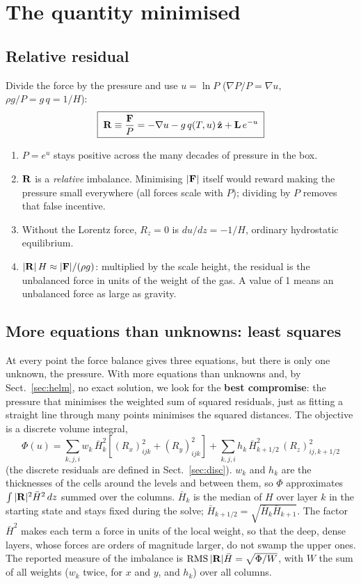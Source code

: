 \section{The quantity minimised}\label{sec:ls}
\subsection{Relative residual}
Divide the force by the pressure and use $u=\ln P$ ($\nabla P/P=\nabla u$, $\rho g/P=g\,q=1/H$):
\begin{equation}
\boxed{\;\mathbf R\equiv\frac{\mathbf F}{P}=-\nabla u-g\,q(T,u)\,\hat{\mathbf z}+\mathbf L\,e^{-u}\;}\label{eq:R}
\end{equation}
\begin{enumerate}
\item $P=e^u$ stays positive across the many decades of pressure in the box.
\item $\mathbf R$ is a \emph{relative} imbalance. Minimising $|\mathbf F|$ itself would reward making the pressure small everywhere (all
forces scale with $P$); dividing by $P$ removes that false incentive.
\item Without the Lorentz force, $R_z=0$ is $du/dz=-1/H$, ordinary hydrostatic equilibrium.
\item $|\mathbf R|\,H\approx|\mathbf F|/(\rho g)$: multiplied by the scale height, the residual is the unbalanced force in units of the
weight of the gas. A value of 1 means an unbalanced force as large as gravity.
\end{enumerate}

\subsection{More equations than unknowns: least squares}
At every point the force balance gives three equations, but there is only one unknown, the pressure. With more equations
than unknowns and, by Sect.~\ref{sec:helm}, no exact solution, we look for the \textbf{best compromise}: the pressure that
minimises the weighted sum of squared residuals, just as fitting a straight line through many points minimises the squared
distances. The objective is a discrete volume integral,
\begin{equation}
\boxed{\;\Phi(u)=\sum_{k,j,i}w_k\,\bar H_k^2\left[(R_x)_{ijk}^2+(R_y)_{ijk}^2\right]+\sum_{k,j,i}h_k\,\bar H_{k+1/2}^2\,(R_z)_{ij,k+1/2}^2\;}
\label{eq:Phi}
\end{equation}
(the discrete residuals are defined in Sect.~\ref{sec:disc}). $w_k$ and $h_k$ are the thicknesses of the cells around the
levels and between them, so $\Phi$ approximates $\int|\mathbf R|^2\bar H^2\,dz$ summed over the columns. $\bar H_k$ is the median of
$H$ over layer $k$ in the starting state and stays fixed during the solve; $\bar H_{k+1/2}=\sqrt{\bar H_k\bar H_{k+1}}$. The
factor $\bar H^2$ makes each term a force in units of the local weight, so that the deep, dense layers, whose forces are
orders of magnitude larger, do not swamp the upper ones. The reported measure of the imbalance is
${\rm RMS}\,|\mathbf R|\bar H=\sqrt{\Phi/W}$, with $W$ the sum of all weights ($w_k$ twice, for $x$ and $y$, and $h_k$) over all
columns.

